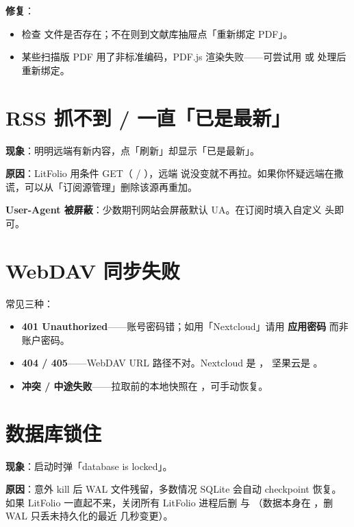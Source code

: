 \textbf{修复}：

\begin{itemize}
  \item 检查  文件是否存在；不在则到文献库抽屉点「重新绑定 PDF」。
  \item 某些扫描版 PDF 用了非标准编码，PDF.js 渲染失败——可尝试用  或
     处理后重新绑定。
\end{itemize}

\section{RSS 抓不到 / 一直「已是最新」}

\textbf{现象}：明明远端有新内容，点「刷新」却显示「已是最新」。

\textbf{原因}：LitFolio 用条件 GET（ / ），远端
说没变就不再拉。如果你怀疑远端在撒谎，可以从「订阅源管理」删除该源再重加。

\textbf{User-Agent 被屏蔽}：少数期刊网站会屏蔽默认 UA。在订阅时填入自定义
 头即可。

\section{WebDAV 同步失败}

常见三种：

\begin{itemize}
  \item \textbf{401 Unauthorized}——账号密码错；如用「Nextcloud」请用 \textbf{应用密码}
    而非账户密码。
  \item \textbf{404 / 405}——WebDAV URL 路径不对。Nextcloud 是 ，
    坚果云是 。
  \item \textbf{冲突 / 中途失败}——拉取前的本地快照在 ，可手动恢复。
\end{itemize}

\section{数据库锁住}

\textbf{现象}：启动时弹「database is locked」。

\textbf{原因}：意外 kill 后 WAL 文件残留，多数情况 SQLite 会自动 checkpoint 恢复。
如果 LitFolio 一直起不来，关闭所有 LitFolio 进程后删  与
（数据本身在 ，删 WAL 只丢未持久化的最近
几秒变更）。

